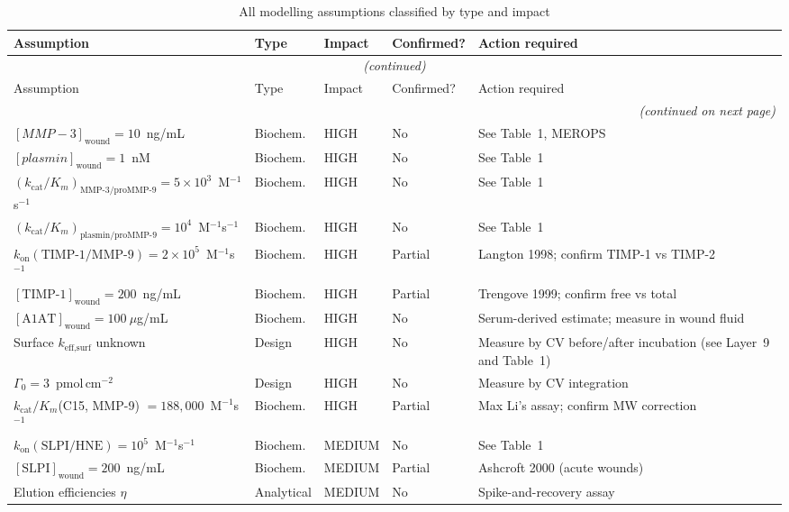 \documentclass[10pt,a4paper]{article}
\begin{document}
{\footnotesize
\begin{longtable}{p{5.1cm}p{2.0cm}p{1.6cm}p{1.7cm}p{4.1cm}}
\caption{All modelling assumptions classified by type and impact}\\
\toprule
Assumption & Type & Impact & Confirmed? & Action required \\
\midrule
\endfirsthead
\multicolumn{5}{c}{\textit{(continued)}}\\
\toprule
Assumption & Type & Impact & Confirmed? & Action required \\
\midrule
\endhead
\midrule
\multicolumn{5}{r}{\textit{(continued on next page)}}\\
\endfoot
\bottomrule
\endlastfoot
$[MMP-3]_\text{wound} = 10$~ng/mL & Biochem. & HIGH & No & See Table~1, MEROPS \\
$[plasmin]_\text{wound} = 1$~nM & Biochem. & HIGH & No & See Table~1 \\
$(k_\text{cat}/K_m)_\text{MMP-3/proMMP-9} = 5\times10^3$~M$^{-1}$s$^{-1}$ & Biochem. & HIGH & No & See Table~1 \\
$(k_\text{cat}/K_m)_\text{plasmin/proMMP-9} = 10^4$~M$^{-1}$s$^{-1}$ & Biochem. & HIGH & No & See Table~1 \\
$k_\text{on}(\text{TIMP-1/MMP-9}) = 2\times10^5$~M$^{-1}$s$^{-1}$ & Biochem. & HIGH & Partial & Langton 1998; confirm TIMP-1 vs TIMP-2 \\
$[\text{TIMP-1}]_\text{wound} = 200$~ng/mL & Biochem. & HIGH & Partial & Trengove 1999; confirm free vs total \\
$[\text{A1AT}]_\text{wound} = 100~\mu$g/mL & Biochem. & HIGH & No & Serum-derived estimate; measure in wound fluid \\
Surface $k_\text{eff,surf}$ unknown & Design & HIGH & No & Measure by CV before/after incubation (see Layer~9 and Table~1) \\
$\Gamma_0 = 3$~pmol\,cm$^{-2}$ & Design & HIGH & No & Measure by CV integration \\
$k_\text{cat}/K_m$(C15, MMP-9) $= 188{,}000$~M$^{-1}$s$^{-1}$ & Biochem. & HIGH & Partial & Max Li's assay; confirm MW correction \\
$k_\text{on}(\text{SLPI/HNE}) = 10^5$~M$^{-1}$s$^{-1}$ & Biochem. & MEDIUM & No & See Table~1 \\
$[\text{SLPI}]_\text{wound} = 200$~ng/mL & Biochem. & MEDIUM & Partial & Ashcroft 2000 (acute wounds) \\
Elution efficiencies $\eta$ & Analytical & MEDIUM & No & Spike-and-recovery assay \\

\end{longtable}}
\end{document}
